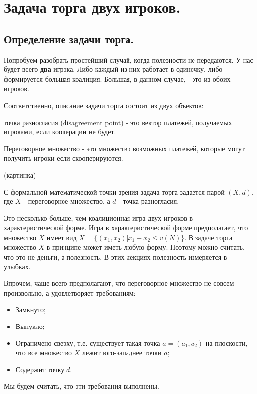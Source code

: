 
\section{Задача торга двух игроков.}




\subsection{Определение задачи торга.}

Попробуем разобрать простейший случай, когда полезности не передаются.
У нас будет всего \textbf{два} игрока. Либо каждый из них работает
в одиночку, либо формируется большая коалиция. Большая, в данном случае,
- это из обоих игроков.

Соответственно, описание задачи торга состоит из двух объектов:

\begin{definition} точка разногласия (disagreement point) - это вектор
платежей, получаемых игроками, если кооперации не будет. \end{definition}

\begin{definition} Переговорное множество - это множество возможных платежей,
которые могут получить игроки если скооперируются. \end{definition}

(картинка)

С формальной математической точки зрения задача торга задается парой
$(X,d)$, где $X$ - переговорное множество, а $d$ - точка разногласия.

Это несколько больше, чем коалиционная игра двух игроков в характеристической
форме. Игра в характеристической форме предполагает, что множество
$X$ имеет вид $X=\{(x_{1},x_{2})|x_{1}+x_{2}\leq v(N)\}$. В задаче
торга множество $X$ в принципе может иметь любую форму. Поэтому можно
считать, что это не деньги, а полезность. В этих лекциях полезность
измеряется в улыбках.

Впрочем, чаще всего предполагают, что переговорное множество не совсем
произвольно, а удовлетворяет требованиям:
\begin{itemize}
\item Замкнуто;
\item Выпукло;
\item Ограничено сверху, т.е. существует такая точка $a=(a_{1},a_{2})$
на плоскости, что все множество $X$ лежит юго-западнее точки $a$;
\item Содержит точку $d$.
\end{itemize}
Мы будем считать, что эти требования выполнены.

